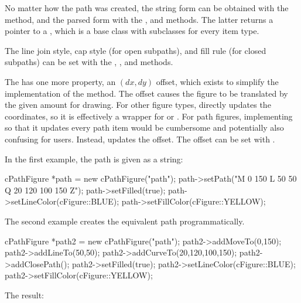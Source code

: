 No matter how the path was created, the string form can be obtained with the
 method, and the parsed form with the ,
and  methods. The latter returns a pointer to a
, which is a base class with subclasses for every
item type.

The line join style, cap style (for open subpaths), and fill rule (for closed
subpaths) can be set with the ,
, and  methods.

The  has one more property, an $(dx,dy)$ offset, which
exists to simplify the implementation of the  method. The offset
causes the figure to be translated by the given amount for drawing. For
other figure types,  directly updates the coordinates, so it
is effectively a wrapper for  or .
For path figures, implementing  so that it updates every path
item would be cumbersome and potentially also confusing for users. Instead,
 updates the offset. The offset can be set with
.

In the first example, the path is given as a string:


\begin{cpp}
cPathFigure *path = new cPathFigure("path");
path->setPath("M 0 150 L 50 50 Q 20 120 100 150 Z");
path->setFilled(true);
path->setLineColor(cFigure::BLUE);
path->setFillColor(cFigure::YELLOW);
\end{cpp}


The second example creates the equivalent path programmatically.

\begin{cpp}
cPathFigure *path2 = new cPathFigure("path");
path2->addMoveTo(0,150);
path2->addLineTo(50,50);
path2->addCurveTo(20,120,100,150);
path2->addClosePath();
path2->setFilled(true);
path2->setLineColor(cFigure::BLUE);
path2->setFillColor(cFigure::YELLOW);
\end{cpp}


The result:

\begin{center}

\end{center}

